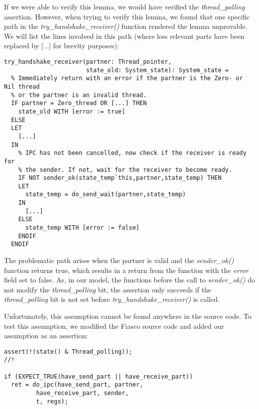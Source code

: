 If we were able to verify this lemma, we would have verified the \emph{thread\_polling} assertion. However, when trying to verify this lemma, we found that one specific path in the \emph{try\_handshake\_receiver()} function rendered the lemma unprovable. We will list the lines involved in this path (where less relevant parts have been replaced by [...] for brevity purposes):

\lstset{language=PVS}
\begin{lstlisting}[caption={PVS: \emph{try\_handshake\_receiver()} problematic lines.}]
% Try to have the sender and receiver agree upon engaging in IPC.
try_handshake_receiver(partner: Thread_pointer, 
                       state_old: System_state): System_state =
  % Immediately return with an error if the partner is the Zero- or Nil thread
  % or the partner is an invalid thread.
  IF partner = Zero_thread OR [...] THEN
    state_old WITH [error := true]
  ELSE
  LET 
    [...]
  IN   
    % IPC has not been cancelled, now check if the receiver is ready for
    % the sender. If not, wait for the receiver to become ready.
    IF NOT sender_ok(state_temp`this,partner,state_temp) THEN
    LET
      state_temp = do_send_wait(partner,state_temp)
    IN
      [...]
    ELSE
      state_temp WITH [error := false]
    ENDIF
  ENDIF
\end{lstlisting}

The problematic path arises when the partner is valid and the \emph{sender\_ok()} function returns true, which results in a return from the function with the \emph{error} field set to false. As, in our model, the functions before the call to \emph{sender\_ok()} do not modify the \emph{thread\_polling} bit, the assertion only succeeds if the \emph{thread\_polling} bit is not set before \emph{try\_handshake\_receiver()} is called.\emptyline

Unfortunately, this assumption cannot be found anywhere in the source code. To test this assumption, we modified the Fiasco source code and added our assumption as an assertion:

\lstset{language=C++}
\begin{lstlisting}[caption={C++: \emph{thread\_polling} bit, added assertion.}]
assert(!(state() & Thread_polling));                                     //!

if (EXPECT_TRUE(have_send_part || have_receive_part))      
  ret = do_ipc(have_send_part, partner,
         have_receive_part, sender,
         t, regs);
\end{lstlisting}

